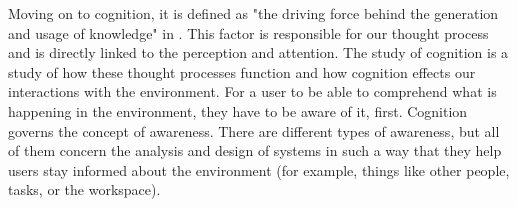 Moving on to cognition, it is defined as "the driving force behind the generation and usage of knowledge" in \parencite{jr_3d_2017}. This factor is responsible for our thought process and is directly linked to the perception and attention. The study of cognition is a study of how these thought processes function and how cognition effects our interactions with the environment.
For a user to be able to comprehend what is happening in the environment, they have to be aware of it, first. Cognition governs the concept of awareness. There are different types of awareness, but all of them concern the analysis and design of systems in such a way that they help users stay informed about the environment (for example, things like other people, tasks, or the workspace).

